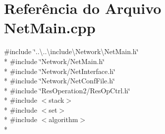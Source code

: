 \section{Referência do Arquivo Net\+Main.\+cpp}
\label{_net_main_8cpp}
{\ttfamily \#include \char`\"{}..\textbackslash{}..\textbackslash{}include\textbackslash{}\+Network\textbackslash{}\+Net\+Main.\+h\char`\"{}}\\*
{\ttfamily \#include \char`\"{}Network/\+Net\+Main.\+h\char`\"{}}\\*
{\ttfamily \#include \char`\"{}Network/\+Net\+Interface.\+h\char`\"{}}\\*
{\ttfamily \#include \char`\"{}Network/\+Net\+Conf\+File.\+h\char`\"{}}\\*
{\ttfamily \#include \char`\"{}Res\+Operation2/\+Res\+Op\+Ctrl.\+h\char`\"{}}\\*
{\ttfamily \#include $<$stack$>$}\\*
{\ttfamily \#include $<$set$>$}\\*
{\ttfamily \#include $<$algorithm$>$}\\*
